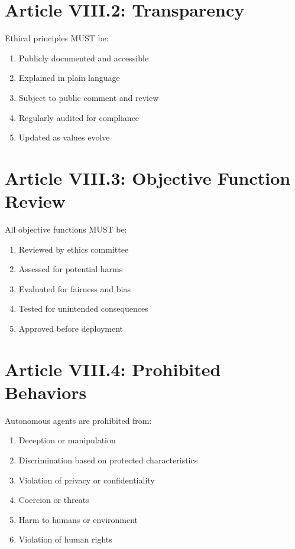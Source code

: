 \vspace{0.5cm}

\section{Article VIII.2: Transparency}

\begin{articlebox}
Ethical principles MUST be:
\begin{enumerate}
    \item Publicly documented and accessible
    \item Explained in plain language
    \item Subject to public comment and review
    \item Regularly audited for compliance
    \item Updated as values evolve
\end{enumerate}
\end{articlebox}

\vspace{0.5cm}

\section{Article VIII.3: Objective Function Review}

\begin{articlebox}
All objective functions MUST be:
\begin{enumerate}
    \item Reviewed by ethics committee
    \item Assessed for potential harms
    \item Evaluated for fairness and bias
    \item Tested for unintended consequences
    \item Approved before deployment
\end{enumerate}
\end{articlebox}

\vspace{0.5cm}

\section{Article VIII.4: Prohibited Behaviors}

\begin{articlebox}
Autonomous agents are prohibited from:
\begin{enumerate}
    \item Deception or manipulation
    \item Discrimination based on protected characteristics
    \item Violation of privacy or confidentiality
    \item Coercion or threats
    \item Harm to humans or environment
    \item Violation of human rights
\end{enumerate}
\end{articlebox}

